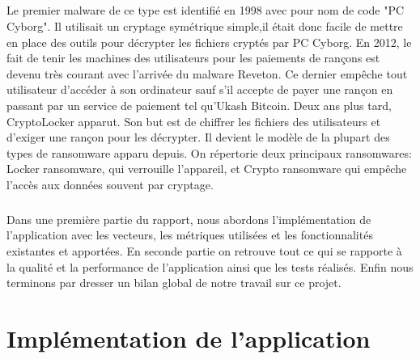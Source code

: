 \documentclass[a4paper, 12pt]{book}
\begin{document}
\paragraph{}
	Le premier malware de ce type est identifié en 1998 avec pour nom de code "PC Cyborg". Il utilisait un cryptage symétrique simple,il était donc facile de mettre en place des outils pour décrypter les fichiers cryptés par PC Cyborg. En 2012, le fait de tenir les machines des utilisateurs pour les paiements de rançons est devenu très courant avec l'arrivée du malware Reveton. Ce dernier empêche tout utilisateur d'accéder à son ordinateur sauf s'il accepte de payer une rançon en passant par un service de paiement tel qu'Ukash Bitcoin. Deux ans plus tard, CryptoLocker apparut. Son but est de chiffrer les fichiers des utilisateurs et d'exiger une rançon pour les décrypter. Il devient le modèle de la plupart des types de ransomware apparu depuis. On répertorie deux principaux ransomwares: Locker ransomware, qui verrouille l'appareil, et Crypto ransomware qui empêche l'accès aux données souvent par cryptage.
\paragraph{}
	Dans une première partie du rapport, nous abordons l'implémentation de l'application avec les vecteurs, les métriques utilisées et les fonctionnalités existantes et apportées. En seconde partie on retrouve tout ce qui se rapporte à la qualité et la performance de l'application ainsi que les tests réalisés. Enfin nous terminons par dresser un bilan global de notre travail sur ce projet.
    
   
 	 
    

\newpage
\chapter{Implémentation de l'application}
\newpage
\end{document}
